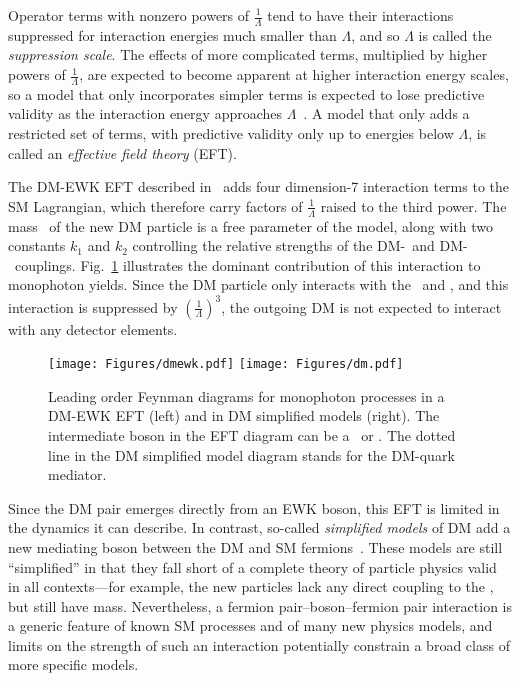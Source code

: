 Operator terms with nonzero powers of $\frac{1}{\Lambda}$ tend to have their interactions suppressed for interaction energies much
smaller than $\Lambda$, and so $\Lambda$ is called the \textit{suppression scale}. The effects of more complicated terms, multiplied by higher powers of $\frac{1}{\Lambda}$,
are expected to become apparent at higher interaction energy scales, so a model that only incorporates simpler terms is expected to
lose predictive validity as the interaction energy approaches $\Lambda$~\cite{ref:j.aop.2013.04.016}. A model that only adds a restricted set of terms,
with predictive validity only up to energies below $\Lambda$, is called an \textit{effective field theory} (EFT).

The DM-EWK EFT described in~\cite{ref:PhysRevD.89.056011} adds four dimension-7 interaction terms to the SM Lagrangian, which therefore carry factors of $\frac{1}{\Lambda}$
raised to the third power. The mass \mdm\ of the new DM particle is a free parameter of the model, along with two constants $k_1$ and $k_2$ controlling
the relative strengths of the DM-\PZ\ and DM-\Pgamma\ couplings.
Fig.~\ref{fig:dm_diagrams} illustrates the dominant contribution of this interaction to monophoton yields. Since the DM
particle only interacts with the \PZ\ and \Pgamma, and this interaction is suppressed by $(\frac{1}{\Lambda})^{3}$, the outgoing DM is not expected to interact
with any detector elements.

\begin{figure}[hbtp]
  \begin{center}
    \texttt{[image: Figures/dmewk.pdf]}
    \texttt{[image: Figures/dm.pdf]}
    \caption{
      Leading order Feynman diagrams for monophoton processes in a DM-EWK EFT (left) and in DM simplified models (right).
      The intermediate boson in the EFT diagram can be a \PZ\ or \Pgamma. The dotted line in the DM simplified model diagram
      stands for the DM-quark mediator.
    }
    \label{fig:dm_diagrams}
  \end{center}
\end{figure}

Since the DM pair emerges directly from an EWK boson, this EFT is limited in the dynamics it can describe. In contrast, so-called \textit{simplified models} of DM add
a new mediating boson between the DM and SM fermions~\cite{ref:1507.00966}. These models are still ``simplified'' in that they fall short of a complete theory of particle
physics valid in all contexts---for example, the new particles lack any direct coupling to the \PH, but still have mass.
Nevertheless, a fermion pair--boson--fermion pair interaction is a generic feature of known SM processes
and of many new physics models, and limits on the strength of such an interaction potentially constrain a broad class of more specific models.

